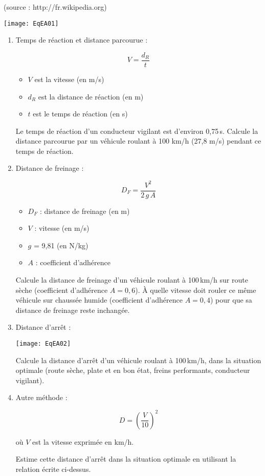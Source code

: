 \begin{exercice}
(source : http://fr.wikipedia.org)

\texttt{[image: EqEA01]}

\begin{enumerate} 
\item Temps de réaction et distance parcourue :

\begin{cadre}
\[ V = \dfrac{d_R}{t} \]
\begin{itemize} 
\item $V$ est la vitesse (en m/s)
\item $d_R$ est la distance de réaction (en m)
\item $t$ est le temps de réaction (en s)
\end{itemize}
\end{cadre}

Le temps de réaction d'un conducteur vigilant est d’environ 0,75\,s. Calcule la distance parcourue par un véhicule roulant à 100 km/h (27,8 m/s) pendant ce temps de réaction.

\item Distance de freinage :

\begin{cadre}
\[D_F = \dfrac{V^2}{2\,g\,A} \]
\begin{itemize}
\item $D_F$ : distance de freinage (en m)
\item $V$ : vitesse (en m/s)
\item $g$ = 9,81 (en N/kg)
\item $A$ : coefficient d'adhérence
\end{itemize}
\end{cadre}

Calcule la distance de freinage d'un véhicule roulant à 100\,km/h sur route sèche (coefficient d'adhérence $A = 0,6$). À quelle vitesse doit rouler ce même véhicule sur chaussée humide (coefficient d'adhérence $A = 0,4$) pour que sa distance de freinage reste inchangée.

\item Distance d'arrêt :

\texttt{[image: EqEA02]}

Calcule la distance d'arrêt d'un véhicule roulant à 100\,km/h, dans la situation optimale (route sèche, plate et en bon état, freins performants, conducteur vigilant).

\item Autre méthode :

\[ D = \left(\dfrac{V}{10}\right)^2 \]

où $V$ est la vitesse exprimée en km/h.

Estime cette distance d'arrêt dans la situation optimale en utilisant la relation écrite ci-dessus.
\end{enumerate}
\end{exercice}
